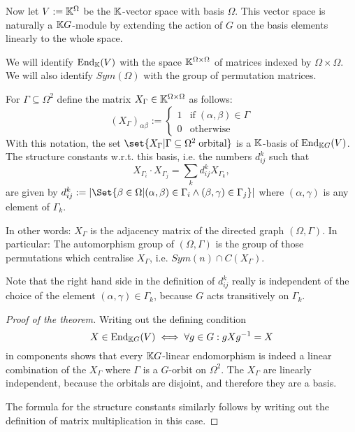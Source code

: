 \documentclass[fontsize=11pt,fleqn,a4paper]{scrartcl}
\begin{document}
\begin{definition}
Now let $V:=\mathbb{K}^\Omega$ be the $\mathbb{K}$-vector space with basis $\Omega$. This vector space is naturally a $\mathbb{K} G$-module by extending the action of $G$ on the basis elements linearly to the whole space.

We will identify $\operatorname{End}_{\mathbb{K}}(V)$ with the space $\mathbb{K}^{\Omega\times\Omega}$ of matrices indexed by $\Omega\times\Omega$. We will also identify $Sym(\Omega)$ with the group of permutation matrices.
\end{definition}

\begin{theoremdef}
For $\Gamma\subseteq\Omega^2$ define the matrix $X_\Gamma\in\mathbb{K}^{\Omega\times\Omega}$ as follows:
\[(X_\Gamma)_{\alpha\beta} := \begin{cases} 1 & \text{if}\;(\alpha,\beta)\in\Gamma \\ 0 & \text{otherwise}\end{cases}\]
With this notation, the set $\set{X_\Gamma | \Gamma\subseteq\Omega^2\;\text{orbital}}$ is a $\mathbb{K}$-basis of $\operatorname{End}_{\mathbb{K} G}(V)$. The structure constants w.r.t. this basis, i.e. the numbers $d_{ij}^k$ such that
\[X_{\Gamma_i} \cdot X_{\Gamma_j} = \sum_{k} d_{ij}^k X_{\Gamma_k},\]
are given by $d_{ij}^k := \abs{\Set{\beta\in\Omega | (\alpha,\beta)\in\Gamma_i \wedge (\beta,\gamma) \in \Gamma_j}}$ where $(\alpha,\gamma)$ is any element of $\Gamma_k$.
\end{theoremdef}
\begin{remark}
In other words: $X_\Gamma$ is the adjacency matrix of the directed graph $(\Omega,\Gamma)$. In particular: The automorphism group of $(\Omega,\Gamma)$ is the group of those permutations which centralise $X_\Gamma$, i.e. $Sym(n) \cap C(X_\Gamma)$.
\end{remark}

\begin{remark}
Note that the right hand side in the definition of $d_{ij}^k$ really is independent of the choice of the element $(\alpha,\gamma)\in\Gamma_k$, because $G$ acts transitively on $\Gamma_k$.
\end{remark}

\begin{proof}[Proof of the theorem]
Writing out the defining condition
\[X\in\operatorname{End}_{\mathbb{K} G}(V) \iff \forall g\in G: gXg^{-1} = X\]
in components shows that every $\mathbb{K} G$-linear endomorphism is indeed a linear combination of the $X_\Gamma$ where $\Gamma$ is a $G$-orbit on $\Omega^2$. The $X_\Gamma$ are linearly independent, because the orbitals are disjoint, and therefore they are a basis.

The formula for the structure constants similarly follows by writing out the definition of matrix multiplication in this case.
\end{proof}
\end{document}
